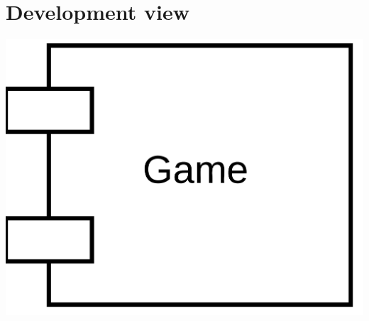 \documentclass{article}
\begin{document}
\section{Development view}
\begin{center}
    \includegraphics[scale=0.05]{developmentview.png}
\end{center}
\end{document}
